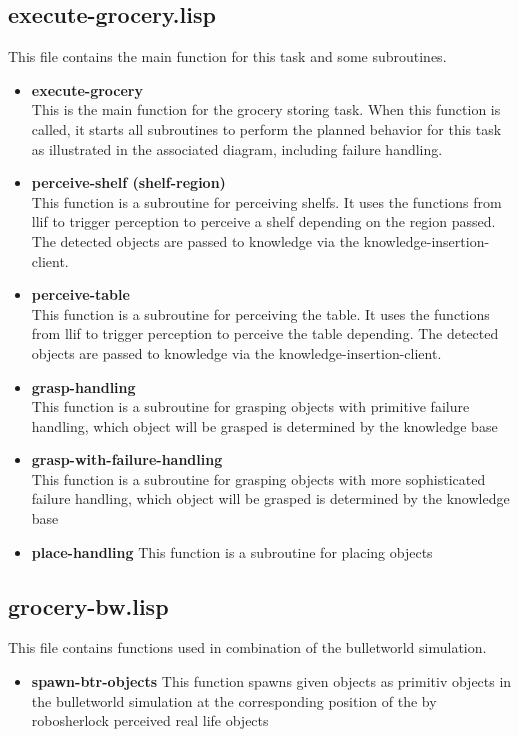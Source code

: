 \documentclass[main.tex]{subfiles}
\begin{document}
		\subsection{execute-grocery.lisp}
		This file contains the main function for this task and some subroutines.
		\begin{itemize}
			\item \textbf{execute-grocery} \\
			This is the main function for the grocery storing task. When this function is called, it starts all subroutines to perform the planned behavior for this task as illustrated in the associated diagram, including failure handling.
			\item \textbf{perceive-shelf (shelf-region)} \\
			This function is a subroutine for perceiving shelfs. It uses the functions from llif to trigger perception to perceive a shelf depending on the region passed. The detected objects are passed to knowledge via the knowledge-insertion-client.
			\item \textbf{perceive-table} \\
			This function is a subroutine for perceiving the table. It uses the functions from llif to trigger perception to perceive the table depending. The detected objects are passed to knowledge via the knowledge-insertion-client.
			\item \textbf{grasp-handling} \\
			This function is a subroutine for grasping objects with primitive failure handling, which object will be grasped is determined by the knowledge base
			\item \textbf{grasp-with-failure-handling} \\
			This function is a subroutine for grasping objects with more sophisticated failure handling, which object will be grasped is determined by the knowledge base
			\item \textbf{place-handling}
			This function is a subroutine for placing objects
		\end{itemize}
		
		\subsection{grocery-bw.lisp}
		This file contains functions used in combination of the bulletworld simulation.
		\begin{itemize}
			\item \textbf{spawn-btr-objects}
			This function spawns given objects as primitiv objects in the bulletworld simulation at the corresponding position of the by robosherlock perceived real life objects 
		\end{itemize}
	  	
\end{document}
